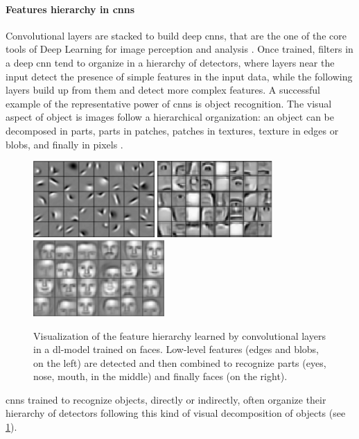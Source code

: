\paragraph{Features hierarchy in \glspl{cnn}}
Convolutional layers are stacked to build deep \glspl{cnn}, that are the one of the core tools of Deep Learning for image perception and analysis \cite{}.
Once trained, filters in a deep \gls{cnn} tend to organize in a hierarchy of detectors, where layers near the input detect the presence of simple features in the input data, while the following layers build up from them and detect more complex features.
A successful example of the representative power of \glspl{cnn} is object recognition.
The visual aspect of object is images follow a hierarchical organization: an object can be decomposed in parts, parts in patches, patches in textures, texture in edges or blobs, and finally in pixels \cite{}.
\begin{figure}
    \centering
    \includegraphics[height=2.9cm]{img/feat-hier-1.png}%
    \hfill%
    \includegraphics[height=2.9cm]{img/feat-hier-2.png}%
    \hfill%
    \includegraphics[height=2.9cm]{img/feat-hier-3.png}%
    \newline
    \caption{
    Visualization of the feature hierarchy learned by convolutional layers in a \gls{dl}-model trained on faces.
    Low-level features (edges and blobs, on the left) are detected and then combined to recognize parts (eyes, nose, mouth, in the middle) and finally faces (on the right).
    }
    \label{fig:back:filter-hier}
\end{figure}
\Glspl{cnn} trained to recognize objects, directly or indirectly, often organize their hierarchy of detectors following this kind of visual decomposition of objects (see \ref{fig:back:filter-hier}).


